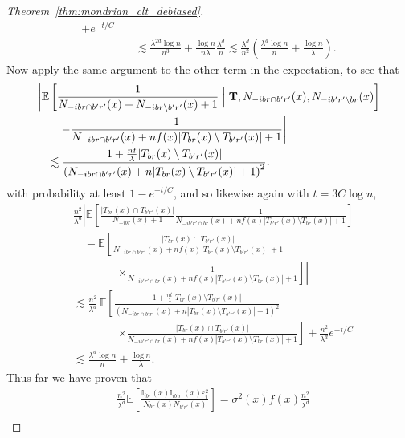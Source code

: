 \documentclass[11pt,lof]{puthesis}
\newcommand{\E}{\ensuremath{\mathbb{E}}}
\newcommand{\I}{\ensuremath{\mathbb{I}}}
\newcommand{\bT}{\ensuremath{\mathbf{T}}}
\theoremstyle{break}
\theoremstyle{proof}
\newtheorem{proof}{Proof}
\begin{document}
\begin{proof}[Theorem~\ref{thm:mondrian_clt_debiased}]
\begin{align*}
+ e^{-t/C} \\
&\quad\lesssim
\frac{\lambda^{2d} \log n}{n^3}
+ \frac{\log n}{n \lambda}
\frac{\lambda^d}{n}
\lesssim
\frac{\lambda^d}{n^2}
\left(
\frac{\lambda^{d} \log n}{n}
+ \frac{\log n}{\lambda}
\right).
\end{align*}
%
Now apply the same argument to the other
term in the expectation, to see that
%
\begin{align*}
&\left|
\E \left[
\frac{1}
{N_{-i b r \cap b' r'}(x)+N_{-i b r \setminus b' r'}(x)+1}
\Bigm| \bT, N_{-i b r \cap b' r'}(x), N_{-i b' r' \setminus b r}(x)
\right]
\right. \\
&\left.
\qquad-
\frac{1}
{N_{-i b r \cap b' r'}(x) + n f(x) |T_{b r}(x) \setminus T_{b' r'}(x)|+1}
\right| \\
&\quad\lesssim
\frac{1 + \frac{n t}{\lambda} |T_{b r}(x) \setminus T_{b' r'}(x)|}
{\left(N_{-i b r \cap b' r'}(x)
+ n |T_{b r}(x) \setminus T_{b' r'}(x)|+1\right)^2}.
\end{align*}
%
with probability at least $1 - e^{-t/C}$,
and so likewise again with $t = 3 C \log n$,
%
\begin{align*}
&\frac{n^2}{\lambda^d}
\left|
\E \left[
\frac{|T_{b r}(x) \cap T_{b' r'}(x)|}{N_{-i b r}(x)+1}
\frac{1}
{N_{-i b' r' \cap b r}(x)+n f(x) |T_{b' r'}(x) \setminus T_{b r}(x)|+1}
\right]
\right.
\\
&\left.
\quad-
\E \left[
\frac{|T_{b r}(x) \cap T_{b' r'}(x)|}
{N_{-i b r \cap b' r'}(x) + n f(x) |T_{b r}(x) \setminus T_{b' r'}(x)|+1}
\right.\right. \\
&\qquad\qquad\left.\left.
\times
\frac{1}
{N_{-i b' r' \cap b r}(x)+n f(x) |T_{b' r'}(x) \setminus T_{b r}(x)|+1}
\right]
\right| \\
&\lesssim
\frac{n^2}{\lambda^d} \,
\E \left[
\frac{1 + \frac{n t}{\lambda} |T_{b r}(x) \setminus T_{b' r'}(x)|}
{\left(N_{-i b r \cap b' r'}(x)
+ n |T_{b r}(x) \setminus T_{b' r'}(x)|+1\right)^2}
\right. \\
&\qquad\qquad\left.
\times
\frac{|T_{b r}(x) \cap T_{b' r'}(x)|}
{N_{-i b' r' \cap b r}(x)+n f(x) |T_{b' r'}(x) \setminus T_{b r}(x)|+1}
\right]
+ \frac{n^2}{\lambda^d}
e^{-t/C} \\
&\lesssim
\frac{\lambda^d \log n}{n}
+ \frac{\log n}{\lambda}.
\end{align*}
%
Thus far we have proven that
%
\begin{align*}
&\frac{n^2}{\lambda^d}
\E \left[
\frac{\I_{i b r}(x) \I_{i b' r'}(x) \varepsilon_i^2}
{N_{b r}(x) N_{b' r'}(x)}
\right]
= \sigma^2(x)
f(x)
\frac{n^2}{\lambda^d} \\

\end{align*}
\end{proof}
\end{document}
